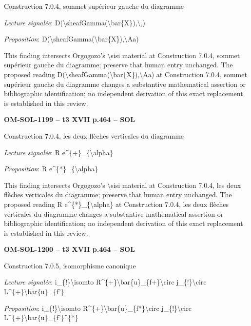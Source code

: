 Construction 7.0.4, sommet supérieur gauche du diagramme\par
\emph{Lecture signalée}: D(\textbackslash{}sheafGamma(\textbackslash{}bar\{X\}),\textbackslash{},)\par
\emph{Proposition}: D(\textbackslash{}sheafGamma(\textbackslash{}bar\{X\}),\textbackslash{}Aa)\par
This finding intersects Orgogozo's \textbackslash{}sisi material at Construction 7.0.4, sommet supérieur gauche du diagramme; preserve that human entry unchanged. The proposed reading D(\textbackslash{}sheafGamma(\textbackslash{}bar\{X\}),\textbackslash{}Aa) at Construction 7.0.4, sommet supérieur gauche du diagramme changes a substantive mathematical assertion or bibliographic identification; no independent derivation of this exact replacement is established in this review.\par
\par\noindent\textbf{OM-SOL-1199 -- t3 XVII p.464 -- SOL}\par
Construction 7.0.4, les deux flèches verticales du diagramme\par
\emph{Lecture signalée}: R e\textasciicircum{}\{+\}\_\{\textbackslash{}alpha\}\par
\emph{Proposition}: R e\textasciicircum{}\{*\}\_\{\textbackslash{}alpha\}\par
This finding intersects Orgogozo's \textbackslash{}sisi material at Construction 7.0.4, les deux flèches verticales du diagramme; preserve that human entry unchanged. The proposed reading R e\textasciicircum{}\{*\}\_\{\textbackslash{}alpha\} at Construction 7.0.4, les deux flèches verticales du diagramme changes a substantive mathematical assertion or bibliographic identification; no independent derivation of this exact replacement is established in this review.\par
\par\noindent\textbf{OM-SOL-1200 -- t3 XVII p.464 -- SOL}\par
Construction 7.0.5, isomorphisme canonique\par
\emph{Lecture signalée}: i\_\{!\}\textbackslash{}isomto R\textasciicircum{}\{+\}\textbackslash{}bar\{u\}\_\{f+\}\textbackslash{}circ j\_\{!\}\textbackslash{}circ L\textasciicircum{}\{+\}\textbackslash{}bar\{u\}\_\{f'\}\par
\emph{Proposition}: i\_\{!\}\textbackslash{}isomto R\textasciicircum{}\{+\}\textbackslash{}bar\{u\}\_\{f*\}\textbackslash{}circ j\_\{!\}\textbackslash{}circ L\textasciicircum{}\{+\}\textbackslash{}bar\{u\}\_\{f'\}\textasciicircum{}\{*\}\par
